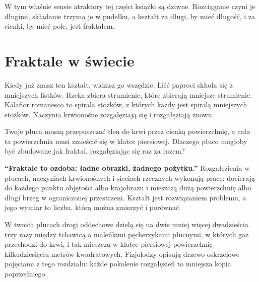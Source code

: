 W tym właśnie sensie atraktory tej części książki są dziwne. Rozciąganie
czyni je długimi, składanie trzyma je w pudełku, a kształt za długi, by mieć
długość, i za cienki, by mieć pole, jest fraktalem.

\section{Fraktale w świecie}
\label{sec:ch11-world}

\noindent
Kiedy już znasz ten kształt, widzisz go wszędzie. Liść paproci składa się z
mniejszych listków. Rzeka zbiera strumienie, które zbierają mniejsze
strumienie. Kalafior romanesco to spirala stożków, z których każdy jest
spiralą mniejszych stożków. Naczynia krwionośne rozgałęziają się i
rozgałęziają znowu.

\begin{think}
Twoje płuca muszą przepuszczać tlen do krwi przez cienką powierzchnię, a
cała ta powierzchnia musi zmieścić się w klatce piersiowej. Dlaczego płuco
mogłoby być zbudowane jak fraktal, rozgałęziając się raz za razem?
\end{think}

\begin{trapbox}
\textbf{\enquote{Fraktale to ozdoba: ładne obrazki, żadnego pożytku.}}
Rozgałęzienia w płucach, naczyniach krwionośnych i sieciach rzecznych
wykonują pracę: docierają do każdego punktu objętości albo krajobrazu i
mieszczą dużą powierzchnię albo długi brzeg w ograniczonej przestrzeni.
Kształt jest rozwiązaniem problemu, a jego wymiar to liczba, którą można
zmierzyć i porównać.
\end{trapbox}

\begin{worldbox}
W twoich płucach drogi oddechowe dzielą się na dwie mniej więcej
dwadzieścia trzy razy między tchawicą a maleńkimi pęcherzykami płucnymi, w
których gaz przechodzi do krwi, i tak mieszczą w klatce piersiowej
powierzchnię kilkudziesięciu metrów kwadratowych. Fizjolodzy opisują drzewo
oskrzelowe pojęciami z tego rozdziału: każde pokolenie rozgałęzień to
mniejsza kopia poprzedniego.
\end{worldbox}

